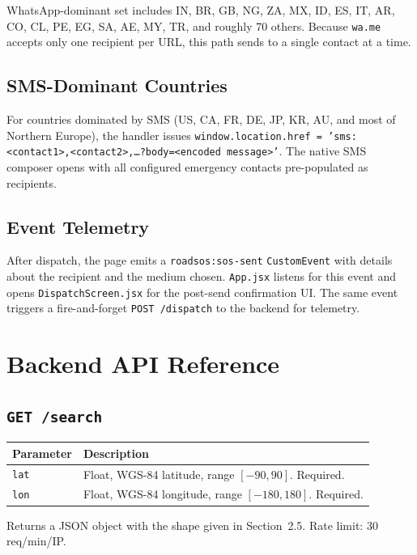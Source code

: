 \documentclass[11pt, a4paper]{article}
\newcommand{\file}[1]{\texttt{\small\color{rsblue}#1}}
\newcommand{\code}[1]{\texttt{\small#1}}
\begin{document}
WhatsApp-dominant set includes IN, BR, GB, NG, ZA, MX, ID, ES, IT, AR, CO, CL, PE, EG, SA, AE, MY, TR, and roughly 70 others. Because \code{wa.me} accepts only one recipient per URL, this path sends to a single contact at a time.

\subsection{SMS-Dominant Countries}

For countries dominated by SMS (US, CA, FR, DE, JP, KR, AU, and most of Northern Europe), the handler issues \code{window.location.href = 'sms:<contact1>,<contact2>,\dots?body=<encoded message>'}. The native SMS composer opens with all configured emergency contacts pre-populated as recipients.

\subsection{Event Telemetry}

After dispatch, the page emits a \code{roadsos:sos-sent} \code{CustomEvent} with details about the recipient and the medium chosen. \file{App.jsx} listens for this event and opens \file{DispatchScreen.jsx} for the post-send confirmation UI. The same event triggers a fire-and-forget \code{POST /dispatch} to the backend for telemetry.

\section{Backend API Reference}

\subsection{\texttt{GET /search}}

\begin{tabularx}{\textwidth}{l X}
\toprule
\textbf{Parameter} & \textbf{Description} \\
\midrule
\code{lat} & Float, WGS-84 latitude, range $[-90, 90]$. Required. \\
\code{lon} & Float, WGS-84 longitude, range $[-180, 180]$. Required. \\
\bottomrule
\end{tabularx}

Returns a JSON object with the shape given in Section~2.5. Rate limit: 30 req/min/IP.
\end{document}
